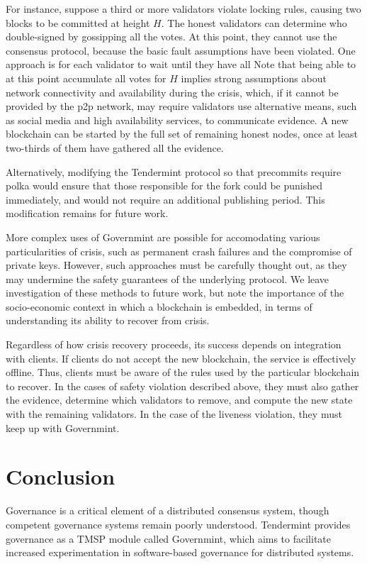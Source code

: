 For instance, suppose a third or more validators violate locking rules,
causing two blocks to be committed at height $H$.
The honest validators can determine who double-signed by gossipping all the votes.
At this point, they cannot use the consensus protocol, because the basic fault assumptions have been violated.
One approach is for each validator to wait until they have all 
Note that being able to at this point accumulate all votes for $H$ 
implies strong assumptions about network connectivity and availability during the crisis,
which, if it cannot be provided by the p2p network, may require validators use alternative means, 
such as social media and high availability services, to communicate evidence.
A new blockchain can be started by the full set of remaining honest nodes, 
once at least two-thirds of them have gathered all the evidence.

Alternatively, modifying the Tendermint protocol so that precommits require polka
would ensure that those responsible for the fork could be punished immediately,
and would not require an additional publishing period. 
This modification remains for future work.

More complex uses of Governmint are possible for accomodating various particularities of crisis,
such as permanent crash failures and the compromise of private keys.
However, such approaches must be carefully thought out, 
as they may undermine the safety guarantees of the underlying protocol.
We leave investigation of these methods to future work, 
but note the importance of the socio-economic context in which a blockchain is embedded, in terms of understanding its ability to recover from crisis.

Regardless of how crisis recovery proceeds, its success depends on integration with clients.
If clients do not accept the new blockchain, the service is effectively offline.
Thus, clients must be aware of the rules used by the particular blockchain to recover.
In the cases of safety violation described above, they must also gather the evidence,
determine which validators to remove, and compute the new state with the remaining validators.
In the case of the liveness violation, they must keep up with Governmint.

\section{Conclusion}

Governance is a critical element of a distributed consensus system, 
though competent governance systems remain poorly understood.
Tendermint provides governance as a TMSP module called Governmint,
which aims to facilitate increased experimentation in software-based governance for distributed systems.


